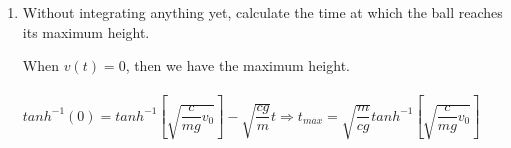 \documentclass[fleqn]{article}
\begin{document}
\begin{enumerate}
\begin{enumerate}
        \textcolor{hwColor}{
          $
            m{a_y}=-mg+cv^2_{y} \Rightarrow a_y=-g+(\dfrac{c}{m})v^2_{y} \\
            \\
            \dfrac{dv_y}{dt}=-g+(\dfrac{c}{m})v^2_{y} \\
            \\
            \bigints_{v_y(0)}^{v_y(t)}\dfrac{dv_y}{g-(\dfrac{c}{m})v^2}=-\bigints_{0}^{t} dt \Rightarrow \dfrac{1}{m}\bigints_{v_y(0)}^{v_y(t)}\dfrac{dv_y}{1-(\dfrac{c}{mg})v^2}=-\bigints_{0}^{t} dt \\
            \\
            u=\sqrt{\dfrac{c}{mg}}v, ~~~ du=\sqrt{\dfrac{c}{mg}}dv \\
            \\
            \\
            \dfrac{1}{g}\sqrt{\dfrac{mg}{c}} \bigints_{u(0)}^{u(t)} \dfrac{du}{1-u^2}=-\bigints_{0}^{t} dt \\
            \\
            \\
            \sqrt{\dfrac{m}{cg}}\left(tanh^{-1}(u(t)-tanh^{-1}(u(0)))\right)=-t \\
            \\
            \\
            tanh^{-1}\left(\sqrt{\dfrac{c}{mg}}v(t)\right)-tanh^{-1}\left(\sqrt{\dfrac{c}{mg}}v(0)\right) \\
            \\
            \\
            v(t)=\sqrt{\dfrac{mg}{c}} tanh\left[tanh^{-1}(\sqrt{\dfrac{c}{mg}}v(0))-\sqrt{\dfrac{c}{mg}}t\right] \\
            \\
            \\
            t=0 \Rightarrow v(t)\sqrt{\dfrac{mg}{c}}tanh\left[tanh^{-1}(\sqrt{\dfrac{c}{mg}}v(0))\right] \\
            \\
            \\
            =v(0)\sqrt{\dfrac{mg}{c}} \sqrt{\dfrac{c}{mg}} \Rightarrow v(t)=v(0)
          $
        }

      \item Without integrating anything yet, calculate the time at which the ball reaches its maximum height.

        \textcolor{hwColor}{
          When $v(t)=0$, then we have the maximum height. \\
          \\
          $
            tanh^{-1}(0)=tanh^{-1}\left[\sqrt{\dfrac{c}{mg}v_0}\right]-\sqrt{\dfrac{cg}{m}}t \Rightarrow t_{max}=\sqrt{\dfrac{m}{cg}}tanh^{-1}\left[\sqrt{\dfrac{c}{mg} v_0}\right]
          $
        }


\end{enumerate}
\end{enumerate}
\end{document}
